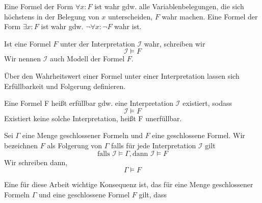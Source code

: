 \begin{leftbar}
  \begin{definition}
    \newline
    Eine Formel der Form $\forall x:F$ ist wahr gdw. alle Variablenbelegungen, die sich höchstens in der Belegung von $x$ unterscheiden, $F$ wahr machen.
    \newline
    \newline
    Eine Formel der Form $\exists x:F$ ist wahr gdw. $\neg \forall x: \neg F$ wahr ist.
  \end{definition}
\end{leftbar}
\noindent
Ist eine Formel $F$ unter der Interpretation $\mathcal{I}$ wahr, schreiben wir
\begin{equation}
  \mathcal{I} \models F
\end{equation}
\noindent
Wir nennen $\mathcal{I}$ auch Modell der Formel $F$.

Über den Wahrheitswert einer Formel unter einer Interpretation lassen sich Erfüllbarkeit und Folgerung definieren.

\begin{leftbar}
  \begin{definition}[Erfüllbarkeit]
    \newline
    Eine Formel F heißt erfüllbar gdw. eine Interpretation $\mathcal{I}$ existiert, sodass
    \begin{equation}
      \mathcal{I} \models F
    \end{equation}
    \noindent
    Existiert keine solche Interpretation, heißt F unerfüllbar.
  \end{definition}
\end{leftbar}

\begin{leftbar}
  \begin{definition}[Folgerung]
    \newline
    Sei $\Gamma$ eine Menge geschlossener Formeln und $F$ eine geschlossene Formel. Wir bezeichnen $F$ als Folgerung von $\Gamma$ falls für jede Interpretation $\mathcal{I}$ gilt
    \begin{equation}
      \text{falls } \mathcal{I} \models \Gamma, \text{dann } \mathcal{I} \models F
    \end{equation}
    Wir schreiben dann,
    \begin{equation}
       \Gamma \models F
    \end{equation}
  \end{definition}
\end{leftbar}
\noindent
Eine für diese Arbeit wichtige Konsequenz ist, das für eine Menge geschlossener Formeln $\Gamma$ und eine geschlossene Formel $F$ gilt, dass

